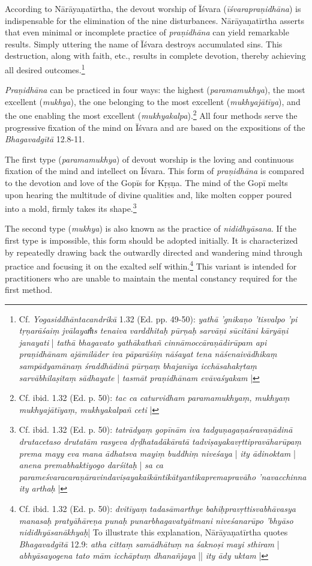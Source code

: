 According to Nārāyaṇatīrtha, the devout worship of Īśvara (\textit{īśvarapraṇidhāna}) is indispensable for the elimination of the nine disturbances. Nārāyaṇatīrtha asserts that even minimal or incomplete practice of \textit{praṇidhāna} can yield remarkable results. Simply uttering the name of Īśvara destroys accumulated sins. This destruction, along with faith, etc., results in complete devotion, thereby achieving all desired outcomes.\footnote{Cf. \textit{Yogasiddhāntacandrikā} 1.32 (Ed. pp. 49-50): \textit{yathā 'gnikaṇo 'tisvalpo 'pi tṛṇarāśaiṃ jvālayam̐s tenaiva varddhitaḥ pūrṇaḥ sarvāṇi sūcitāni kāryāṇi janayati} | \textit{tathā bhagavato yathākathañ cinnāmoccāraṇādirūpam api praṇidhānam ajāmilāder iva pāparāśiṃ nāśayat tena nāśenaivādhikaṃ sampādyamānaṃ śraddhādinā pūrṇaṃ bhajanīya icchāsahakṛtaṃ sarvābhilaṣitaṃ sādhayate} | \textit{tasmāt praṇidhānam evāvaśyakam} |}

\textit{Praṇidhāna} can be practiced in four ways: the highest (\textit{paramamukhya}), the most excellent (\textit{mukhya}), the one belonging to the most excellent (\textit{mukhyajātīya}), and the one enabling the most excellent (\textit{mukhyakalpa}).\footnote{Cf. ibid. 1.32 (Ed. p. 50): \textit{tac ca caturvidham paramamukhyaṃ, mukhyaṃ mukhyajātīyaṃ, mukhyakalpañ ceti} |} All four methods serve the progressive fixation of the mind on Īśvara and are based on the expositions of the \textit{Bhagavadgītā} 12.8-11.

The first type (\textit{paramamukhya}) of devout worship is the loving and continuous fixation of the mind and intellect on Īśvara. This form of \textit{praṇidhāna} is compared to the devotion and love of the Gopīs for Kṛṣṇa. The mind of the Gopī melts upon hearing the multitude of divine qualities and, like molten copper poured into a mold, firmly takes its shape.\footnote{Cf. ibid. 1.32 (Ed. p. 50): \textit{tatrādyaṃ gopīnām iva tadguṇagaṇaśravaṇādinā drutacetaso drutatām rasyeva dṛḍhatadākāratā tadviṣayakavṛttipravāharūpaṃ prema mayy eva mana ādhatsva mayiṃ buddhiṃ niveśaya} | \textit{ity ādinoktam} | \textit{anena premabhaktiyogo darśitaḥ} | \textit{sa ca parameśvaracaraṇāravindaviṣayakaikāntikātyantikapremapravāho 'navacchinna ity arthaḥ} |}

The second type (\textit{mukhya}) is also known as the practice of \textit{nididhyāsana}. If the first type is impossible, this form should be adopted initially. It is characterized by repeatedly drawing back the outwardly directed and wandering mind through practice and focusing it on the exalted self within.\footnote{Cf. ibid. 1.32 (Ed. p. 50): \textit{dvitīyaṃ tadasāmarthye bahiḥpravṛttisvabhāvasya manasaḥ pratyāhāreṇa punaḥ punarbhagavatyātmani niveśanarūpo 'bhyāso nididhyāsanākhyaḥ}| To illustrate this explanation, Nārāyaṇatīrtha quotes \textit{Bhagavadgītā} 12.9: \textit{atha cittaṃ samādhātuṃ na śaknoṣi mayi sthiram} | \textit{abhyāsayogena tato mām icchāptuṃ dhanañjaya} || \textit{ity ādy uktam} |} This variant is intended for practitioners who are unable to maintain the mental constancy required for the first method.

